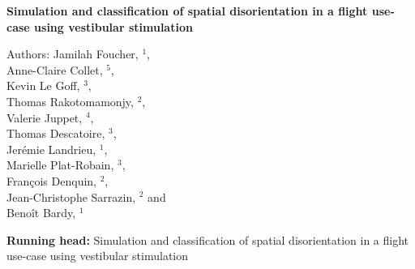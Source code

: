 

\begin{titlepage} %

\raggedright%
	

\textbf{\LARGE Simulation and classification of spatial disorientation in a flight use-case using vestibular stimulation}
	

	
{\normalsize Authors: Jamilah Foucher, $^{1}$, \\
Anne-Claire Collet, $^{5}$, \\
Kevin Le Goff, $^{3}$, \\
Thomas Rakotomamonjy, $^{2}$, \\
Valerie Juppet, $^{4}$, \\
Thomas Descatoire, $^{3}$, \\
Jerémie Landrieu, $^{1}$, \\
Marielle Plat-Robain, $^{3}$, \\
François Denquin, $^{2}$, \\
Jean-Christophe Sarrazin, $^{2}$ and \\
Beno\^it Bardy, $^{1}$}
	
\vspace{0.1cm}


\vspace{0.1cm}
{\bf Running head:} Simulation and classification of spatial disorientation in a flight use-case using vestibular stimulation


\end{titlepage}
